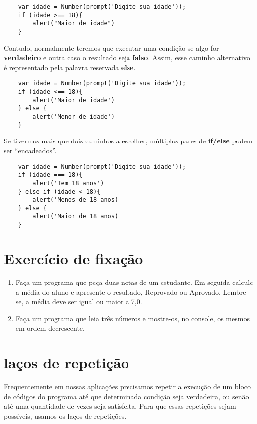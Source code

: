 \begin{lstlisting}
	var idade = Number(prompt('Digite sua idade'));
	if (idade >== 18){
		alert("Maior de idade")	
	}
\end{lstlisting}

Contudo, normalmente teremos que executar uma condição se algo for \textbf{verdadeiro} e outra caso o resultado seja \textbf{falso}. Assim, esse caminho alternativo é representado pela palavra reservada \textbf{else}. 

\begin{lstlisting}
	var idade = Number(prompt('Digite sua idade'));
	if (idade <== 18){
		alert('Maior de idade')	
	} else {
		alert('Menor de idade')	
	}
\end{lstlisting}

Se tivermos mais que dois caminhos a escolher, múltiplos pares de \textbf{if/else} podem ser ``encadeados''. 

\begin{lstlisting}
	var idade = Number(prompt('Digite sua idade'));
	if (idade === 18){
		alert('Tem 18 anos')	
	} else if (idade < 18){
		alert('Menos de 18 anos)	
	} else {
		alert('Maior de 18 anos)	
	}
\end{lstlisting}

\section{Exercício de fixação}

\begin{enumerate}
	\item Faça um programa que peça duas notas de um estudante. Em seguida calcule a média do aluno e apresente o resultado, Reprovado ou Aprovado. Lembre-se, a média deve ser igual ou maior a 7,0.
	\item Faça um programa que leia três números e mostre-os, no console, os mesmos em ordem decrescente. 
\end{enumerate}

\section{laços de repetição}

Frequentemente em nossas aplicações precisamos repetir a execução de um bloco de códigos do programa até que determinada condição seja verdadeira, ou senão até uma quantidade de vezes seja satisfeita. Para que essas repetições sejam possíveis, usamos os laços de repetições.

